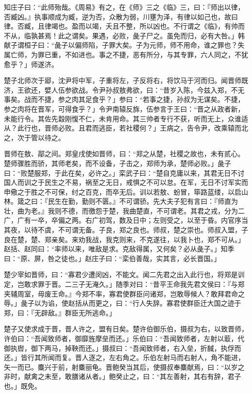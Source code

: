 \documentclass[]{article}
\begin{document}
知庄子曰：``此师殆哉。《周易》有之，在《师》三之《临》三，曰：『师出以律，否臧凶。』执事顺成为臧，逆为否，众散为弱，川壅为泽，有律以如己也，故曰律。否臧，且律竭也。盈而以竭，夭且不整，所以凶也。不行谓之《临》，有帅而不从，临孰甚焉！此之谓矣。果遇，必败，彘子尸之。虽免而归，必有大咎。」韩献子谓桓子曰：``彘子以偏师陷，子罪大矣。子为元师，师不用命，谁之罪也？失属亡师，为罪已重，不如进也。事之不捷，恶有所分，与其专罪，六人同之，不犹愈乎？」师遂济。

楚子北师次于郔，沈尹将中军，子重将左，子反将右，将饮马于河而归。闻晋师既济，王欲还，嬖人伍参欲战。令尹孙叔敖弗欲，曰：``昔岁入陈，今兹入郑，不无事矣。战而不捷，参之肉其足食乎？」参曰：``若事之捷，孙叔为无谋矣。不捷，参之肉将在晋军，可得食乎？」令尹南辕反旆，伍参言于王曰：``晋之从政者新，未能行令。其佐先縠刚愎不仁，未肯用命。其三帅者专行不获，听而无上，众谁适从？此行也，晋师必败。且君而逃臣，若社稷何？」王病之，告令尹，改乘辕而北之，次于管以待之。

晋师在敖、鄗之间。郑皇戌使如晋师，曰：``郑之从楚，社稷之故也，未有贰心。楚师骤胜而骄，其师老矣，而不设备，子击之，郑师为承，楚师必败。」彘子曰：``败楚服郑，于此在矣，必许之。」栾武子曰：``楚自克庸以来，其君无日不讨国人而训之于民生之不易，祸至之无日，戒惧之不可以怠。在军，无日不讨军实而申儆之于胜之不可保，纣之百克，而卒无后。训以若敖、蚡冒，筚路蓝缕，以启山林。箴之曰：『民生在勤，勤则不匮。』不可谓骄。先大夫子犯有言曰：『师直为壮，曲为老。』我则不德，而徼怨于楚，我曲楚直，不可谓老。其君之戎，分为二广，广有一卒，卒偏之两。右广初驾，数及日中；左则受之，以至于昏。内官序当其夜，以待不虞，不可谓无备。子良，郑之良也。师叔，楚之崇也。师叔入盟，子良在楚，楚、郑亲矣。来劝我战，我克则来，不克遂往，以我卜也，郑不可从。」赵括、赵同曰：``率师以来，唯敌是求。克敌得属，又何矣？必从彘子。」知季曰：``原、屏，咎之徒也。」赵庄子曰：``栾伯善哉，实其言，必长晋国。」

楚少宰如晋师，曰：``寡君少遭闵凶，不能文。闻二先君之出入此行也，将郑是训定，岂敢求罪于晋。二三子无淹久。」随季对曰：``昔平王命我先君文侯曰：『与郑夹辅周室，毋废王命。』今郑不率，寡君使群臣问诸郑，岂敢辱候人？敢拜君命之辱。」彘子以为谄，使赵括从而更之，曰：``行人失辞。寡君使群臣迁大国之迹于郑，曰：『无辟敌。』群臣无所逃命。」

楚子又使求成于晋，晋人许之，盟有日矣。楚许伯御乐伯，摄叔为右，以致晋师，许伯曰：``吾闻致师者，御靡旌摩垒而还。」乐伯曰：``吾闻致师者，左射以菆，代御执辔，御下两马，掉鞅而还。」摄叔曰：``吾闻致师者，右入垒，折馘，执俘而还。」皆行其所闻而复。晋人逐之，左右角之。乐伯左射马而右射人，角不能进，矢一而已。麋兴于前，射麋丽龟。晋鲍癸当其后，使摄叔奉麋献焉，曰：``以岁之非时，献禽之未至，敢膳诸从者。」鲍癸止之，曰：``其左善射，其右有辞，君子也。」既免。
\end{document}
